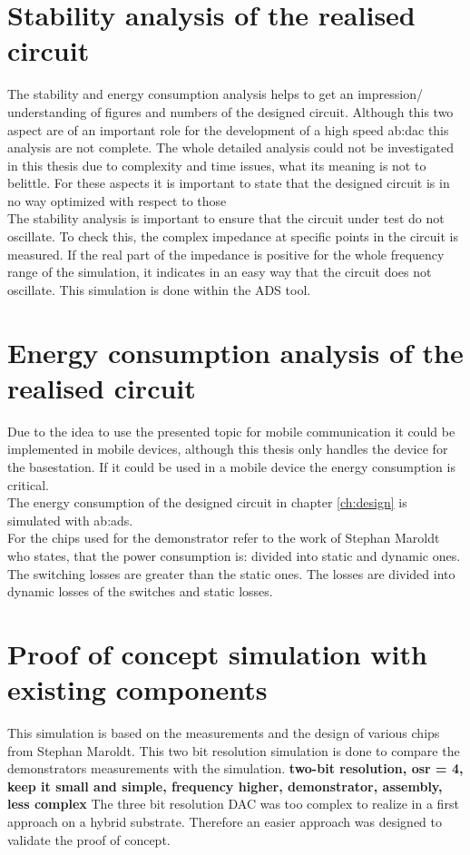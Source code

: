 \section{Stability analysis of the realised circuit}
The stability and energy consumption analysis helps to get an impression/ understanding of figures and numbers of the designed circuit. Although this two aspect are of an important role for the development of a high speed \gls{ab:dac} this analysis are not complete. The whole detailed analysis could not be investigated in this thesis due to complexity and time issues, what its meaning is not to belittle. For these aspects it is important to state that the designed circuit is in no way optimized with respect to those \\
The stability analysis is important to ensure that the circuit under test do not oscillate. 
 To check this, the complex impedance at specific points in the circuit is measured.
 If the real part of the impedance is positive for the whole frequency range of the simulation, it indicates in an easy way that the circuit does not oscillate.
This simulation is done within the ADS tool. 

\section{Energy consumption analysis of the realised circuit}
Due to the idea to use the presented topic for mobile communication it could be implemented in mobile devices, although this thesis only handles the device for the basestation. If it could be used in a mobile device the energy consumption is critical.\\
The energy consumption of the designed circuit in chapter \ref{ch:design} is simulated with \gls{ab:ads}.\\
 For the chips used for the demonstrator refer to the work of Stephan Maroldt who states, that the power consumption is:  divided into static and dynamic ones. The switching losses are greater than the static ones.
The losses are divided into dynamic losses of the switches and static losses.

\section{Proof of concept simulation with existing components}
This simulation is based on the measurements and the design of various chips from Stephan Maroldt.
This two bit resolution simulation is done to compare the demonstrators measurements with the simulation. \textbf{two-bit resolution, osr = 4, keep it small and simple, frequency higher, demonstrator, assembly, less complex} 
The three bit resolution DAC was too complex to realize in a first approach on a hybrid substrate. Therefore an easier approach was designed to validate the proof of concept.

